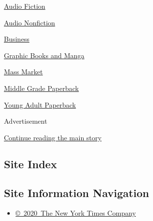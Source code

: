 \href{/books/best-sellers/audio-fiction/}{Audio Fiction}

\href{/books/best-sellers/audio-nonfiction/}{Audio Nonfiction}

\href{/books/best-sellers/business-books/}{Business}

\href{/books/best-sellers/graphic-books-and-manga/}{Graphic Books and
Manga}

\href{/books/best-sellers/mass-market-monthly/}{Mass Market}

\href{/books/best-sellers/middle-grade-paperback-monthly/}{Middle Grade
Paperback}

\href{/books/best-sellers/young-adult-paperback-monthly/}{Young Adult
Paperback}

Advertisement

\protect\hyperlink{after-bottom}{Continue reading the main story}

\hypertarget{site-index}{%
\subsection{Site Index}\label{site-index}}

\hypertarget{site-information-navigation}{%
\subsection{Site Information
Navigation}\label{site-information-navigation}}

\begin{itemize}
\tightlist
\item
  \href{https://help.nytimes3xbfgragh.onion/hc/en-us/articles/115014792127-Copyright-notice}{©~2020~The
  New York Times Company}
\end{itemize}

